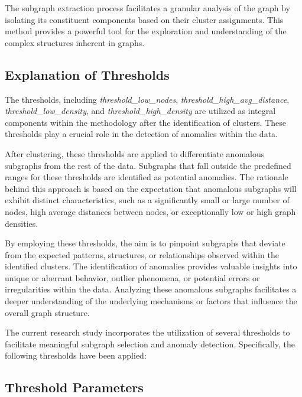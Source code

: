 \documentclass[10pt,twocolumn,a4paper]{article}
\begin{document}
The subgraph extraction process facilitates a granular analysis of the graph by isolating its constituent components based on their cluster assignments. This method provides a powerful tool for the exploration and understanding of the complex structures inherent in graphs.


\subsection{Explanation of Thresholds}

The thresholds, including \textit{threshold\_low\_nodes}, \textit{threshold\_high\_avg\_distance}, \textit{threshold\_low\_density}, and \textit{threshold\_high\_density} are utilized as integral components within the methodology after the identification of clusters. These thresholds play a crucial role in the detection of anomalies within the data.

After clustering, these thresholds are applied to differentiate anomalous subgraphs from the rest of the data. Subgraphs that fall outside the predefined ranges for these thresholds are identified as potential anomalies. The rationale behind this approach is based on the expectation that anomalous subgraphs will exhibit distinct characteristics, such as a significantly small or large number of nodes, high average distances between nodes, or exceptionally low or high graph densities.

By employing these thresholds, the aim is to pinpoint subgraphs that deviate from the expected patterns, structures, or relationships observed within the identified clusters. The identification of anomalies provides valuable insights into unique or aberrant behavior, outlier phenomena, or potential errors or irregularities within the data. Analyzing these anomalous subgraphs facilitates a deeper understanding of the underlying mechanisms or factors that influence the overall graph structure.

The current research study incorporates the utilization of several thresholds to facilitate meaningful subgraph selection and anomaly detection. Specifically, the following thresholds have been applied:







\subsection{Threshold Parameters}
\end{document}
